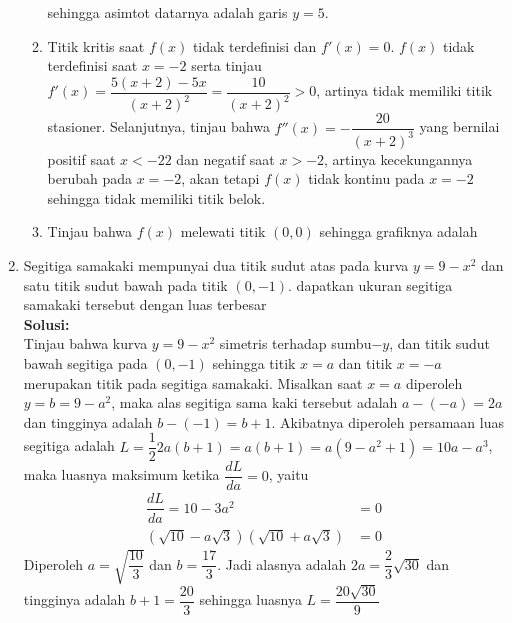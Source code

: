\documentclass{article}
\begin{document}
\begin{enumerate}
\begin{enumerate}
		sehingga asimtot datarnya adalah garis $y=5$.
		\item Titik kritis saat $f(x)$ tidak terdefinisi dan $f'(x)=0$. $f(x)$ tidak terdefinisi saat $x=-2$ serta tinjau $f'(x) = \dfrac{5(x+2)-5x}{(x+2)^2} = \dfrac{10}{(x+2)^2}>0$, artinya tidak memiliki titik stasioner. Selanjutnya, tinjau bahwa $f''(x)=-\dfrac{20}{(x+2)^3}$ yang bernilai positif saat $x<-22$ dan negatif saat $x>-2$, artinya kecekungannya berubah pada $x=-2$, akan tetapi $f(x)$ tidak kontinu pada $x=-2$ sehingga tidak memiliki titik belok.
		\item Tinjau bahwa $f(x)$ melewati titik $(0,0)$ sehingga grafiknya adalah 
		\begin{center}
		\end{center}
	\end{enumerate}
	\item Segitiga samakaki mempunyai dua titik sudut atas pada kurva $y=9-x^2$ dan satu titik sudut bawah pada titik $(0,-1)$. dapatkan ukuran segitiga samakaki tersebut dengan luas terbesar
	\\[0.1 cm] \textbf{Solusi:}\\
	Tinjau bahwa kurva $y=9-x^2$ simetris terhadap sumbu$-y$, dan titik sudut bawah segitiga pada $(0,-1)$ sehingga titik $x=a$ dan titik $x=-a$ merupakan titik pada segitiga samakaki. Misalkan saat $x=a$ diperoleh $y=b=9-a^2$, maka alas segitiga sama kaki tersebut adalah $a-(-a)=2a$ dan tingginya adalah $b-(-1)=b+1$. Akibatnya diperoleh persamaan luas segitiga adalah $L=\dfrac{1}{2}2a(b+1)=a(b+1)=a(9-a^2+1)=10a-a^3$, maka luasnya maksimum ketika $\dfrac{dL}{da} = 0$, yaitu
	\begin{align*}
	\dfrac{dL}{da} = 10-3a^2 &= 0\\
	(\sqrt{10}-a\sqrt{3})(\sqrt{10}+a\sqrt{3}) &= 0
\end{align*}
Diperoleh $a=\sqrt{\dfrac{10}{3}}$ dan $b=\dfrac{17}{3}$. Jadi alasnya adalah $2a=\dfrac{2}{3}\sqrt{30}$ dan tingginya adalah $b+1=\dfrac{20}{3}$ sehingga luasnya $L=\dfrac{20\sqrt{30}}{9}$

\end{enumerate}
\end{document}
